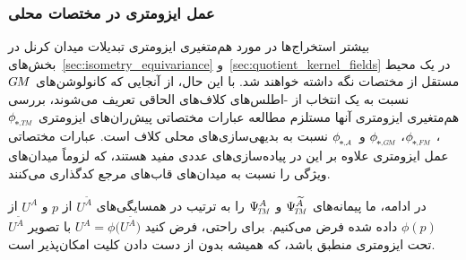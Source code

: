 \subsubsection{عمل ایزومتری در مختصات محلی}
\label{sec:isom_coordinatization}

بیشتر استخراج‌ها در مورد هم‌متغیری ایزومتری تبدیلات میدان کرنل در بخش‌های~\ref{sec:isometry_equivariance} و~\ref{sec:quotient_kernel_fields} در یک محیط مستقل از مختصات نگه داشته خواهند شد.
با این حال، از آنجایی که کانولوشن‌های $G\mkern-1.4muM$ نسبت به یک انتخاب از -اطلس‌های کلاف‌های الحاقی تعریف می‌شوند، بررسی هم‌متغیری ایزومتری آنها مستلزم مطالعه عبارات مختصاتی پیش‌ران‌های ایزومتری $\dphiTM$، $\dphiFM$، $\dphiGM$ و $\dphiA$ نسبت به بدیهی‌سازی‌های محلی کلاف است.
عبارات مختصاتی عمل ایزومتری علاوه بر این در پیاده‌سازی‌های عددی مفید هستند، که لزوماً میدان‌های ویژگی را نسبت به میدان‌های قاب‌های مرجع کدگذاری می‌کنند.

در ادامه، ما پیمانه‌های $\PsiTM^{\widetilde{A}}$ و $\PsiTM^A$ را به ترتیب در همسایگی‌های $U^{\widetilde{A}}$ از $p$ و $U^A$ از $\phi(p)$ داده شده فرض می‌کنیم.
برای راحتی، فرض کنید $U^A = \phi\big(U^{\widetilde{A}}\big)$ با تصویر $U^{\widetilde{A}}$ تحت ایزومتری منطبق باشد، که همیشه بدون از دست دادن کلیت امکان‌پذیر است.




